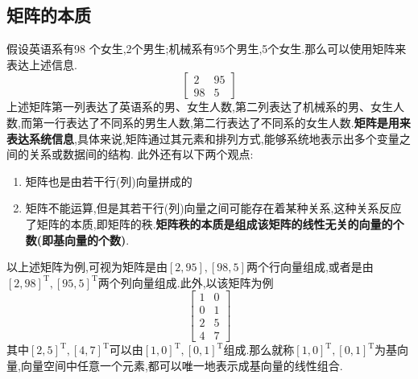 \documentclass[8pt a4paper,oneside,UTF8]{ctexbook}
\begin{document}
\begin{sloppypar}
    \subsection{矩阵的本质}
    假设英语系有98 个女生,2个男生;机械系有95个男生,5个女生.那么可以使用矩阵来表达上述信息.
    $$
        \begin{bmatrix}
            2  & 95 \\
            98 & 5
        \end{bmatrix}
    $$
    上述矩阵第一列表达了英语系的男、女生人数,第二列表达了机械系的男、女生人数,而第一行表达了不同系的男生人数,第二行表达了不同系的女生人数.\textbf{矩阵是用来表达系统信息},具体来说,矩阵通过其元素和排列方式,能够系统地表示出多个变量之间的关系或数据间的结构. 此外还有以下两个观点:
    \begin{enumerate}
        \item 矩阵也是由若干行(列)向量拼成的
        \item 矩阵不能运算,但是其若干行(列)向量之间可能存在着某种关系,这种关系反应了矩阵的本质,即矩阵的秩.\textbf{矩阵秩的本质是组成该矩阵的线性无关的向量的个数(即基向量的个数)}.
    \end{enumerate}
    以上述矩阵为例,可视为矩阵是由$[2,95],[98,5]$两个行向量组成,或者是由$[2,98]^{\mathrm{T}},[95,5]^{\mathrm{T}}$两个列向量组成.此外,以该矩阵为例$$\begin{bmatrix}
            1 & 0 \\
            0 & 1 \\
            2 & 5 \\
            4 & 7
        \end{bmatrix}$$其中$[2,5]^{\mathrm{T}},[4,7]^{\mathrm{T}}$可以由$[1,0]^{\mathrm{T}},[0,1]^{\mathrm{T}}$组成.那么就称$[1,0]^{\mathrm{T}},[0,1]^{\mathrm{T}}$为基向量,向量空间中任意一个元素,都可以唯一地表示成基向量的线性组合.

\end{sloppypar}
\end{document}
